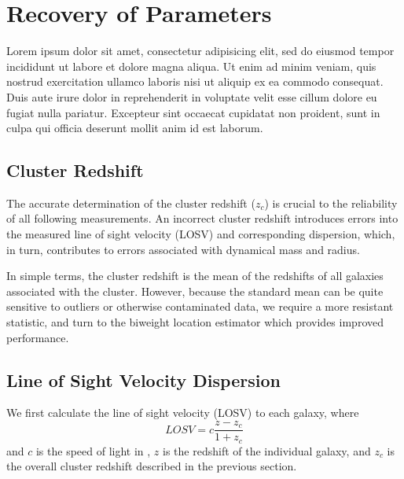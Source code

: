 \documentclass[apj, revtex4]{emulateapj}
\begin{document}
\section{Recovery of Parameters}

Lorem ipsum dolor sit amet, consectetur adipisicing elit, sed do eiusmod tempor incididunt ut labore et dolore magna aliqua. Ut enim ad minim veniam, quis nostrud exercitation ullamco laboris nisi ut aliquip ex ea commodo consequat. Duis aute irure dolor in reprehenderit in voluptate velit esse cillum dolore eu fugiat nulla pariatur. Excepteur sint occaecat cupidatat non proident, sunt in culpa qui officia deserunt mollit anim id est laborum.

\subsection{Cluster Redshift}
The accurate determination of the cluster redshift ($z_c$) is crucial to the reliability of all following measurements. An incorrect cluster redshift introduces errors into the measured line of sight velocity (LOSV) and corresponding dispersion, which, in turn, contributes to errors associated with dynamical mass and radius. 

In simple terms, the cluster redshift is the  mean of the redshifts of all galaxies associated with the cluster. However, because the standard mean can be quite sensitive to outliers or otherwise contaminated data, we require a more resistant statistic, and turn to the biweight location estimator \citep{Beers1990} which provides improved performance. 

\subsection{Line of Sight Velocity Dispersion}\label{sec:LOSVD}
We first calculate the line of sight velocity (LOSV) to each galaxy, where
\begin{equation}
	LOSV = c\frac{z - z_c}{1+z_c}
\end{equation}
and $c$ is the speed of light in \kms, $z$ is the redshift of the individual galaxy, and $z_c$ is the overall cluster redshift described in the previous section.
\end{document}
